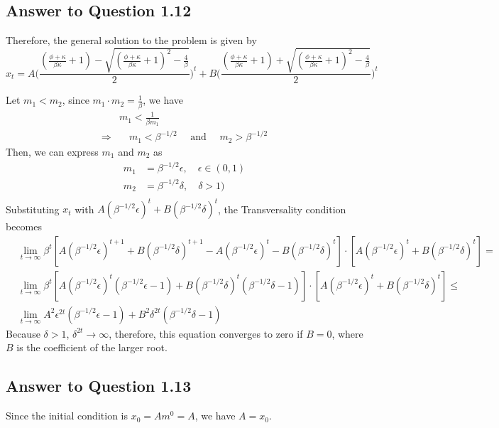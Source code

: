 \documentclass[11pt]{article}
\theoremstyle{definition}
\theoremstyle{boldtitle} %
\numberwithin{equation}{section}
\numberwithin{figure}{section}
\numberwithin{table}{section}
\begin{document}
\subsection*{Answer to Question 1.12}
Therefore, the general solution to the problem is given by 
\[
x_t = A \bigg(\frac{\left( \frac{\phi + \kappa }{\beta \kappa } + 1 \right) -  \sqrt{\left(\frac{\phi + \kappa }{\beta \kappa } + 1 \right)^2 -\frac{4}{\beta}} }{2} \bigg)^t + B \bigg(\frac{\left( \frac{\phi + \kappa }{\beta \kappa } + 1 \right) +  \sqrt{\left(\frac{\phi + \kappa }{\beta \kappa } + 1 \right)^2 -\frac{4}{\beta}} }{2} \bigg)^t 
\]


\noindent Let $m_1 < m_2$, since $m_1 \cdot m_2 = \frac{1}{\beta}$, we have
\begin{align*}
& m_1 < \frac{1}{\beta m_1} \\
\Rightarrow & \quad m_1 < \beta^{-1/2} \quad \text{ and } \quad m_2 > \beta^{-1/2}
\end{align*}
Then, we can express $m_1$ and $m_2$ as 
\begin{align*}
    m_1 & = \beta^{-1/2} \epsilon, \quad \epsilon \in (0,1) \\ 
    m_2 & = \beta^{-1/2} \delta, \quad \delta > 1)  \\ 
\end{align*}
Substituting $x_t$ with $A ( \beta^{-1/2} \epsilon)^t + B (\beta^{-1/2} \delta)^t$, 
the Transversality condition becomes 
\begin{align*}
    & \lim_{t \rightarrow \infty} \beta^t \left[  A ( \beta^{-1/2} \epsilon)^{t+1} + B (\beta^{-1/2} \delta)^{t+1} - A ( \beta^{-1/2} \epsilon)^t - B (\beta^{-1/2} \delta)^t\right] \cdot \left[  A ( \beta^{-1/2} \epsilon)^t + B (\beta^{-1/2} \delta)^t \right] = \\ 
& \lim_{t \rightarrow \infty} \beta^t \left[  A ( \beta^{-1/2} \epsilon)^{t}\left( \beta^{-1/2} \epsilon - 1 \right) + B (\beta^{-1/2} \delta)^{t} \left(\beta^{-1/2} \delta - 1 \right) \right] \cdot \left[  A ( \beta^{-1/2} \epsilon)^t + B (\beta^{-1/2} \delta)^t \right]  \leq \\ 
& \lim_{t \rightarrow \infty} A^2 \epsilon^{2t} \left( \beta^{-1/2} \epsilon - 1 \right) + B^2 \delta^{2t} \left(\beta^{-1/2} \delta - 1 \right) 
\end{align*}
Because $\delta > 1$, $\delta^{2t} \rightarrow \infty$, therefore, this equation converges to zero if $B = 0$,
where $B$ is the coefficient of the larger root.


\subsection*{Answer to Question 1.13}
Since the initial condition is $x_0 = A m^0 =A$, we have $A = x_0$.
\end{document}
